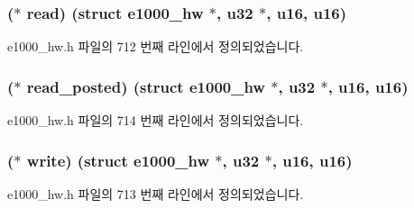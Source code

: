 \subsubsection[{\texorpdfstring{read}{read}}]{($\ast$ read) (struct {\bf e1000\+\_\+hw} $\ast$, {\bf u32} $\ast$, {\bf u16}, {\bf u16})}\hypertarget{structe1000__mbx__operations_a3a4b80add78b522ac96d82a7c69af156}{}\label{structe1000__mbx__operations_a3a4b80add78b522ac96d82a7c69af156}


e1000\+\_\+hw.\+h 파일의 712 번째 라인에서 정의되었습니다.

\subsubsection[{\texorpdfstring{read\+\_\+posted}{read_posted}}]{($\ast$ read\+\_\+posted) (struct {\bf e1000\+\_\+hw} $\ast$, {\bf u32} $\ast$, {\bf u16}, {\bf u16})}\hypertarget{structe1000__mbx__operations_a81420a36230ffcb5e2e39490898caf03}{}\label{structe1000__mbx__operations_a81420a36230ffcb5e2e39490898caf03}


e1000\+\_\+hw.\+h 파일의 714 번째 라인에서 정의되었습니다.

\subsubsection[{\texorpdfstring{write}{write}}]{($\ast$ write) (struct {\bf e1000\+\_\+hw} $\ast$, {\bf u32} $\ast$, {\bf u16}, {\bf u16})}\hypertarget{structe1000__mbx__operations_ab4d0e326295ff22f5f8d2616c3052e1e}{}\label{structe1000__mbx__operations_ab4d0e326295ff22f5f8d2616c3052e1e}


e1000\+\_\+hw.\+h 파일의 713 번째 라인에서 정의되었습니다.

